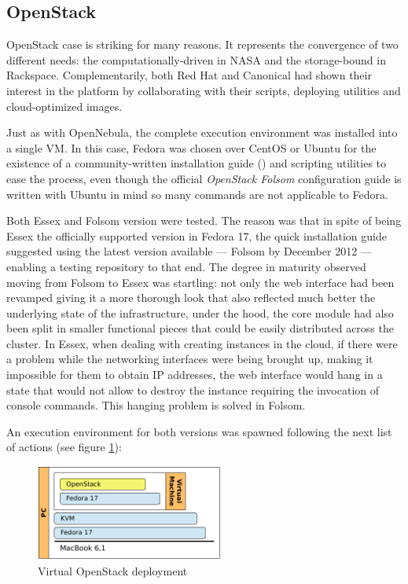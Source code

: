 \subsection{OpenStack}\label{subsec:openstack}

\noindent OpenStack case is striking for many reasons. It represents the convergence of two different needs: the computationally-driven in NASA and the storage-bound in Rackspace. Complementarily, both Red Hat and Canonical had shown their interest in the platform by collaborating with their scripts, deploying utilities and cloud-optimized images.

Just as with OpenNebula, the complete execution environment was installed into a single VM. In this case, Fedora was chosen over CentOS or Ubuntu for the existence of a community-written installation guide (\cite{quickstartfedoraos}) and scripting utilities to ease the process, even though the official \emph{OpenStack Folsom} configuration guide \cite{installdeployosfolsom} is written with Ubuntu in mind so many commands are not applicable to Fedora.

Both Essex and Folsom version were tested. The reason was that in spite of being Essex the officially supported version in Fedora 17, the quick installation guide suggested using the latest version available --- Folsom by December 2012 --- enabling a testing repository to that end. The degree in maturity observed moving from Folsom to Essex was startling: not only the web interface had been revamped giving it a more thorough look that also reflected much better the underlying state of the infrastructure, under the hood, the core module had also been split in smaller functional pieces that could be easily distributed across the cluster. In Essex, when dealing with creating instances in the cloud, if there were a problem while the networking interfaces were being brought up, making it impossible for them to obtain IP addresses, the web interface would hang in a state that would not allow to destroy the instance requiring the invocation of console commands. This hanging problem is solved in Folsom.

An execution environment for both versions was spawned following the next list of actions (see figure \ref{fig:openstack}):

\begin{figure}[tbp]
\begin{center}
\includegraphics[width=0.55\textwidth]{imagenes/010.pdf}
 \caption{Virtual OpenStack deployment}
\label{fig:openstack}
\end{center}
\end{figure}

